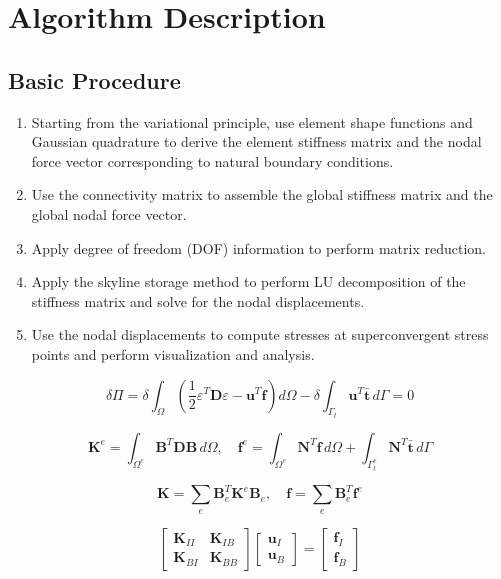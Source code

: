 \documentclass[a4paper,12pt]{report}
\begin{document}
\chapter{Algorithm Description}
\section{Basic Procedure}
\begin{enumerate}
    \item Starting from the variational principle, use element shape functions and Gaussian quadrature to derive the element stiffness matrix and the nodal force vector corresponding to natural boundary conditions.
    
    \item Use the connectivity matrix to assemble the global stiffness matrix and the global nodal force vector.
    
    \item Apply degree of freedom (DOF) information to perform matrix reduction.
    
    \item Apply the skyline storage method to perform LU decomposition of the stiffness matrix and solve for the nodal displacements.
    
    \item Use the nodal displacements to compute stresses at superconvergent stress points and perform visualization and analysis.
\end{enumerate}

\[
\delta \Pi = \delta \int_{\Omega} \left( \frac{1}{2} \varepsilon^T \mathbf{D} \varepsilon - \mathbf{u}^T \mathbf{f} \right) d\Omega - \delta \int_{\Gamma_t} \mathbf{u}^T \bar{\mathbf{t}} \, d\Gamma = 0
\]

\[
\mathbf{K}^e = \int_{\Omega^e} \mathbf{B}^T \mathbf{D} \mathbf{B} \, d\Omega, \quad 
\mathbf{f}^e = \int_{\Omega^e} \mathbf{N}^T \mathbf{f} \, d\Omega + \int_{\Gamma_t^e} \mathbf{N}^T \bar{\mathbf{t}} \, d\Gamma
\]

\[
\mathbf{K} = \sum_e \mathbf{B}_e^T \mathbf{K}^e \mathbf{B}_e, \quad 
\mathbf{f} = \sum_e \mathbf{B}_e^T \mathbf{f}^e
\]

\[
\begin{bmatrix}
\mathbf{K}_{II} & \mathbf{K}_{IB} \\
\mathbf{K}_{BI} & \mathbf{K}_{BB}
\end{bmatrix}
\begin{bmatrix}
\mathbf{u}_I \\
\mathbf{u}_B
\end{bmatrix}
=
\begin{bmatrix}
\mathbf{f}_I \\
\mathbf{f}_B
\end{bmatrix}
\]
\end{document}
